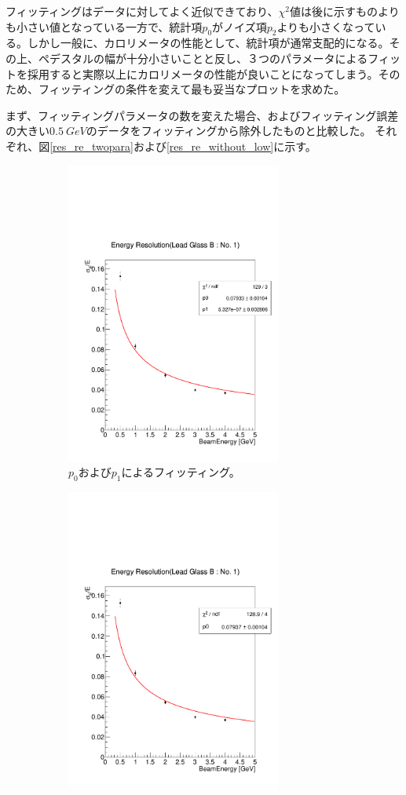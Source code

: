 フィッティングはデータに対してよく近似できており、$\chi^2$値は後に示すものよりも小さい値となっている一方で、統計項$p_0$がノイズ項$p_2$よりも小さくなっている。しかし一般に、カロリメータの性能として、統計項が通常支配的になる。その上、ペデスタルの幅が十分小さいことと反し、３つのパラメータによるフィットを採用すると実際以上にカロリメータの性能が良いことになってしまう。そのため、フィッティングの条件を変えて最も妥当なプロットを求めた。

まず、フィッティングパラメータの数を変えた場合、およびフィッティング誤差の大きい$\SI{0.5}{GeV}$のデータをフィッティングから除外したものと比較した。
それぞれ、図\ref{res_re_twopara}および\ref{res_re_without_low}に示す。

\begin{figure}[H]
	\begin{subfigure}{.5\textwidth}
		\begin{center}
 		 	\includegraphics[width=200pt]{./Figure/EBESAnalysis/res_re_twopara.pdf} 
			  \caption{$p_0$および$p_1$によるフィッティング。}
  			\label{fig:sfig1}
 		\end{center}
	\end{subfigure}
	\begin{subfigure}{.5\textwidth}
		\begin{center}
			\includegraphics[width=200pt]{./Figure/EBESAnalysis/res_onepara.pdf}%

\end{center}
\end{subfigure}
\end{figure}

